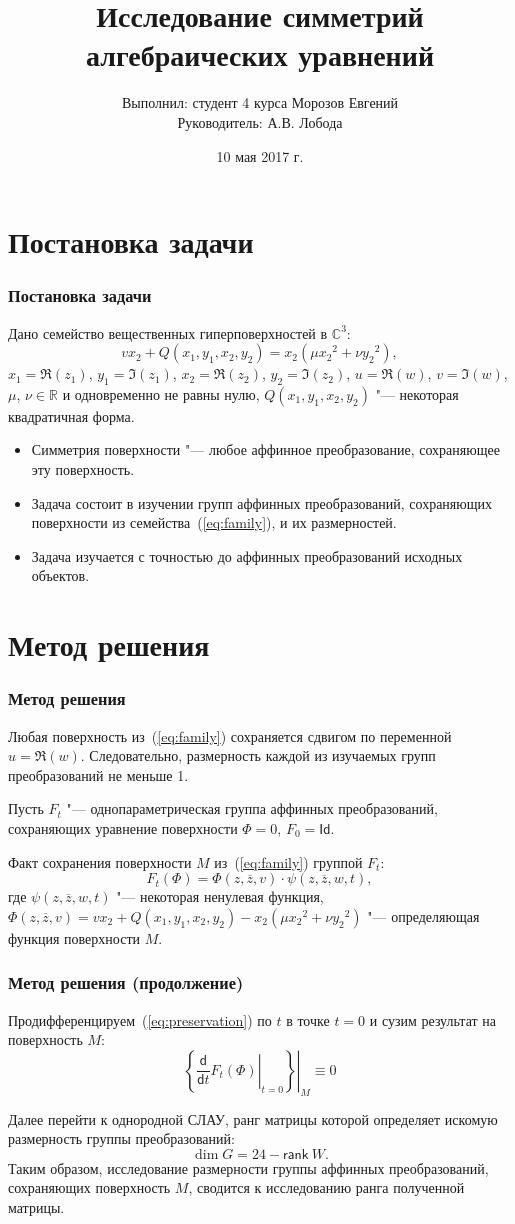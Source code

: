 \documentclass[russian,hyperref={unicode}]{beamer}
\title{Исследование симметрий алгебраических уравнений}
\institute
{
	Воронежский Государственный Университет \\
	Факультет Компьютерных Наук \\
	Кафедра Цифровых Технологий
}
\author
{
	Выполнил: студент 4 курса Морозов Евгений \\
	Руководитель: А.В. Лобода
}
\date{10 мая 2017 г.}
\begin{document}
\frame{\titlepage}

\section{Постановка задачи}
\frame
{
  \frametitle{Постановка задачи}
  Дано семейство вещественных гиперповерхностей в $\mathbb{C}^3$:
  \begin{equation}\label{eq:family}
    v x_2 + Q(x_1, y_1, x_2, y_2) = x_2 (\mu {x_2}^2 + \nu {y_2}^2),
  \end{equation}
  $x_1 = \Re(z_1)$, $y_1 = \Im(z_1)$, $x_2 = \Re(z_2)$, $y_2 = \Im(z_2)$, $u = \Re(w)$,
  $v = \Im(w)$, $\mu$, $\nu \in \mathbb{R}$ и одновременно не равны нулю, $Q(x_1, y_1,
  x_2, y_2)$ "--- некоторая квадратичная форма.

  \begin{itemize}
	\item Симметрия поверхности "--- любое аффинное преобразование, сохраняющее эту поверхность.
    \item Задача состоит в изучении групп аффинных преобразований, сохраняющих поверхности из семейства~(\ref{eq:family}), и их размерностей.
	\item Задача изучается с точностью до аффинных преобразований исходных объектов.
  \end{itemize}
}
\section{Метод решения}
\frame
{
  \frametitle{Метод решения}
  Любая поверхность из~(\ref{eq:family}) сохраняется сдвигом по переменной $u = \Re(w)$. Следовательно, размерность каждой из изучаемых групп преобразований не меньше 1. 
  
  Пусть $F_t$ "--- однопараметрическая группа аффинных преобразований, сохраняющих уравнение поверхности $\Phi = 0$, $F_0 = \mathsf{Id}$. 
  
  Факт сохранения поверхности $M$ из~(\ref{eq:family}) группой $F_t$:
  \begin{equation}\label{eq:preservation}
  	F_t(\Phi) = \Phi(z, \overline{z}, v) \cdot \psi(z, \overline{z}, w, t),
  \end{equation}
  где $\psi(z, \overline{z}, w, t)$ "--- некоторая ненулевая функция, $\Phi(z, \overline{z}, v) = v x_2 + Q(x_1, y_1, x_2, y_2) - x_2 (\mu {x_2}^2 + \nu {y_2}^2)$ "--- определяющая функция поверхности $M$.
}
\frame
{
  \frametitle{Метод решения (продолжение)}
  Продифференцируем~(\ref{eq:preservation}) по $t$ в точке $t=0$ и сузим результат на поверхность $M$:
  \begin{equation}\label{eq:main_eq}
  	\left.\left\{ \left.\frac{\mathsf d}{\mathsf d t}F_t(\Phi) \right|_{t=0}\right\}\right|_{M} \equiv 0
  \end{equation}
  
  Далее перейти к однородной СЛАУ, ранг матрицы которой определяет искомую размерность группы преобразований:
  $$
  	\dim G = 24 - \mathsf{rank}\ W.
  $$
  Таким образом, исследование размерности группы аффинных преобразований, сохраняющих поверхность $M$, сводится к исследованию ранга полученной матрицы.
}
\end{document}
